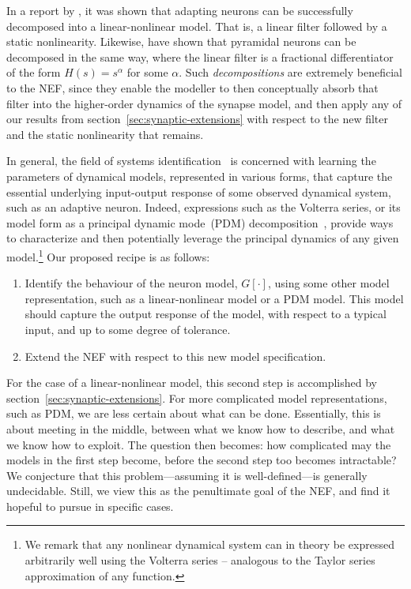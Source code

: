 In a report by \citet{hunsberger2016}, it was shown that adapting neurons can be successfully decomposed into a linear-nonlinear model.
That is, a linear filter followed by a static nonlinearity.
Likewise, \citet{lundstrom2008fractional} have shown that pyramidal neurons can be decomposed in the same way, where the linear filter is a fractional differentiator of the form $H(s) = s^\alpha$ for some $\alpha$.
Such \emph{decompositions} are extremely beneficial to the NEF, since they enable the modeller to then conceptually absorb that filter into the higher-order dynamics of the synapse model, and then apply any of our results from section~\ref{sec:synaptic-extensions} with respect to the new filter and the static nonlinearity that remains.

In general, the field of systems identification~\citep{nelles2013nonlinear} is concerned with learning the parameters of dynamical models, represented in various forms, that capture the essential underlying input-output response of some observed dynamical system, such as an adaptive neuron.
Indeed, expressions such as the Volterra series, or its model form as a principal dynamic mode~(PDM) decomposition~\citep{eikenberry2015principal}, provide ways to characterize and then potentially leverage the principal dynamics of any given model.\footnote{%
We remark that any nonlinear dynamical system can in theory be expressed arbitrarily well using the Volterra series -- analogous to the Taylor series approximation of any function.}
Our proposed recipe is as follows: 
\begin{enumerate}
\item Identify the behaviour of the neuron model, $G\left[ \cdot \right]$, using some other model representation, such as a linear-nonlinear model or a PDM model. This model should capture the output response of the model, with respect to a typical input, and up to some degree of tolerance.
\item Extend the NEF with respect to this new model specification.
\end{enumerate}
For the case of a linear-nonlinear model, this second step is accomplished by section~\ref{sec:synaptic-extensions}.
For more complicated model representations, such as PDM, we are less certain about what can be done.
Essentially, this is about meeting in the middle, between what we know how to describe, and what we know how to exploit.
The question then becomes: how complicated may the models in the first step become, before the second step too becomes intractable?
We conjecture that this problem---assuming it is well-defined---is generally undecidable.
Still, we view this as the penultimate goal of the NEF, and find it hopeful to pursue in specific cases.

